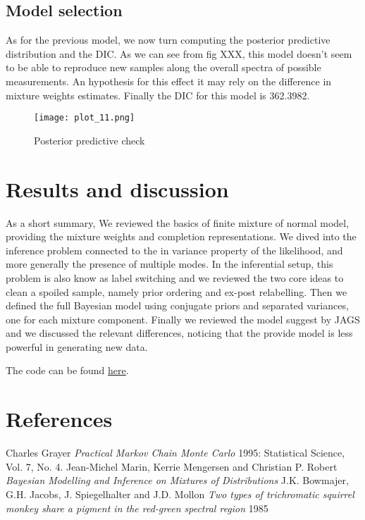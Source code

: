 \documentclass{article}
\begin{document}
\subsection{Model selection}
As for the previous model, we now turn computing the posterior predictive distribution and the DIC. As we can see from fig XXX, this model doesn't seem to be able to reproduce new samples along the overall spectra of possible measurements. An hypothesis for this effect it may rely on the difference in mixture weights estimates. Finally the DIC for this model is 362.3982.

\begin{figure}[h!]
    \centering
    \texttt{[image: plot\_11.png]}
    \caption{Posterior predictive check}
    \label{Monkey measurement}
\end{figure}

\section{Results and discussion}
As a short summary, We reviewed the basics of finite mixture of normal model, providing the mixture weights and completion representations. We dived into the inference problem connected to the in variance property of the likelihood, and more generally the presence of multiple modes. In the inferential setup, this problem is also know as label switching and we reviewed the two core ideas to clean a spoiled sample, namely prior ordering and ex-post relabelling. Then we defined the full Bayesian model using conjugate priors and separated variances, one for each mixture component. Finally we reviewed the model suggest by JAGS and we discussed the relevant differences, noticing that the provide model is less powerful in generating new data.

The code can be found \href{https://github.com/d3sm0/mixgauss}{here}.

\section{References}
\begin{reference}
     Charles Grayer {\em Practical Markov Chain Monte Carlo} 
    1995: Statistical Science, Vol. 7, No. 4.
     Jean-Michel Marin, Kerrie Mengersen and Christian P. Robert {\em
    Bayesian Modelling and Inference on Mixtures of Distributions}
     J.K. Bowmajer, G.H. Jacobs, J. Spiegelhalter and J.D. Mollon{\em
    Two types of trichromatic squirrel monkey share a pigment in the red-green spectral region}
    1985
\end{reference}
\end{document}
